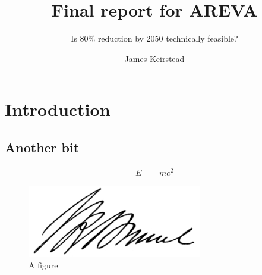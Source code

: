 \documentclass[a4paper, vc]{impreport}
\title{Final report for AREVA}
\subtitle{Is 80\% reduction by 2050 technically feasible?}
\author{James Keirstead}
\begin{document}
\begin{titlingpage}
  \maketitle
\end{titlingpage}

\chapter{Introduction}

\lipsum[1]

\section{Another bit}
\lipsum[2]

\begin{align*}
E &= mc^2
\end{align*}

\begin{figure}[htbp]
  \includegraphics[width=3in]{Isambard_Kingdom_Brunel_signature.png}
  \caption{A figure}
\end{figure}
\end{document}
